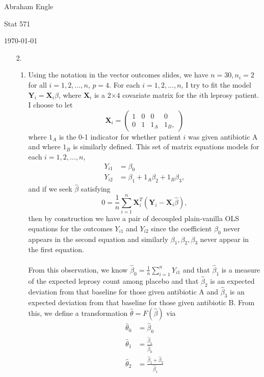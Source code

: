 \documentclass[11pt]{article}
\begin{document}
\pagestyle{empty}
\hfill Abraham Engle

\hfill Stat 571

\hfill \today
\begin{enumerate}
	\item[2.]
		\begin{enumerate}
			\item Using the notation in the vector outcomes slides, we have $n=30, n_i=2$ for all $i=1,2,\dotsc,n$, $p=4$. For each $i=1,2,\dotsc,n$, I try to fit the model $\bm{Y}_i = \bm{X}_i\beta$, where $\bm{X}_i$ is a 2$\times 4$ covariate matrix for the $i$th leprosy patient. I choose to let 
			\[
				\bm{X}_i = \begin{pmatrix}
			1 & 0 & 0 & 0 \\
			0 & 1 & 1_A & 1_B,
			\end{pmatrix}
			\]
			where $1_A$ is the 0-1 indicator for whether patient $i$ was given antibiotic A and where $1_B$ is similarly defined. This set of matrix equations models for each $i=1,2,\dotsc,n$,
			\begin{align*}
				Y_{i1} &= \beta_0 \\
				Y_{i2} &= \beta_1 + 1_A\beta_2 + 1_B\beta_3,
			\end{align*}
			and if we seek $\widehat{\beta}$ satisfying
			\[
				0 = \frac{1}{n}\sum_{i=1}^n \bm{X}_i^T(\bm{Y}_i - \bm{X}_i\widehat{\beta}),
			\]
			then by construction we have a pair of decoupled plain-vanilla OLS equations for the outcomes $Y_{i1}$ and $Y_{i2}$ since the coefficient $\beta_0$ never appears in the second equation and similarly $\beta_1,\beta_2,\beta_3$ never appear in the first equation. \\ \\
			From this observation, we know $\widehat{\beta}_0 = \frac{1}{n}\sum_{i=1}^n Y_{i1}$ and that $\widehat{\beta}_1$ is a measure of the expected leprosy count among placebo and that $\widehat{\beta}_2$ is an expected deviation from that baseline for those given antibiotic A and $\widehat{\beta}_3$ is an expected deviation from that baseline for those given antibiotic B. From this, we define a transformation $\widehat{\theta} = F(\widehat{\beta})$ via
			\begin{align*}
			\widehat{\theta}_0 &= \widehat{\beta}_0 \\
			\widehat{\theta}_1 &= \frac{\widehat{\beta}_1}{\widehat{\beta}_0} \\
			\widehat{\theta}_2 &= \frac{\widehat{\beta}_1 + \widehat{\beta}_2}{\widehat{\beta}_1} \\

\end{align*}
\end{enumerate}
\end{enumerate}
\end{document}
